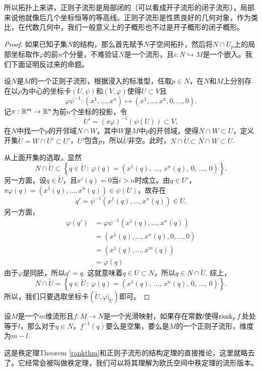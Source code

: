 所以拓扑上来讲，正则子流形是局部闭的（可以看成开子流形的闭子流形），局部来说他就像后几个坐标恒等的等高线。正则子流形是性质良好的几何对象，作为类比，在代数几何中，我们一般意义上的子概形也不过是开子概形的闭子概形。

\begin{proof}
如果已知子集$N$的结构，那么首先赋予$N$子空间拓扑，然后将$N\cap U_p$上的局部坐标取作$\varphi$的前$n$个分量，不难验证$N$是一个流形，且$i:N\hookrightarrow M$是一个嵌入。我们下面证明反过来的命题。

设$N$是$M$的一个正则子流形，根据浸入的标准型，任取$p\in N$，在$N$和$M$上分别存在以$p$为中心的坐标卡$(U,\psi)$和$(V,\varphi)$使得$U\subset V$且
\[
	\varphi\psi^{-1}:(x^1,\dots,x^n)\mapsto (x^1,\dots,x^n,0,\dots,0).
\]
记$\pi:\mathbb{R}^m\to \mathbb{R}^n$为前$n$个坐标的投影，令
\[
	U'=(\pi\varphi)^{-1}(\psi(U))\subset V,
\]
在$N$中找一个$p$的开邻域$N\cap W$，其中$W$是$M$中$p$的开邻域，使得$N\cap W\subset U$，定义开集$\tilde{U}=W\cap U'\subset U'$，$U'$包含$p$，所以$\tilde{U}$非空。此时，$N\cap \tilde{U}\subset N\cap W\subset U$.

从上面开集的选取，显然
\[
	N\cap \tilde{U}\subset \left\{q\in \tilde{U}\,:\,\varphi(q)=\left(x^1(q)\text{, $\dots$, }x^n(q)\text{, }0\text{, $\dots$, }0\right)\right\}.
\]
另一方面，设$q\in \tilde{U}$，且$x^i(q)=0$当$i> n$时成立。由$q\in U'$，$\pi\varphi(q)=(x^1(q),\dots,x^n(q))\in \psi(U)$，故存在
\[
	q'=\psi^{-1}(x^1(q),\dots,x^n(q))\in U.
\]
另一方面，
\begin{align*}
\varphi(q')&=\varphi\psi^{-1}(x^1(q),\dots,x^n(q))\\
&=(x^1(q),\dots,x^n(q),0,\dots,0)\\
&=(x^1(q),\dots,x^m(q))\\
&=\varphi(q)
\end{align*}
由于$\varphi$是同胚，所以$q'=q$. 这就意味着$q\in U\subset N$，所以$q\in N\cap \tilde{U}$. 综上，
\[
	N\cap \tilde{U}= \left\{q\in \tilde{U}\,:\,\varphi(q)=\left(x^1(q)\text{, $\dots$, }x^n(q)\text{, }0\text{, $\dots$, }0\right)\right\}.
\]
所以，我们只要选取坐标卡$(\tilde{U},\varphi|_{\tilde{U}})$即可。
\end{proof}

\begin{pro}
\label{ranktheo}设$M$是一个$m$维流形且$f:M\to N$是一个光滑映射，如果存在常数$l$使得$\operatorname{rank}_p f$处处等于$l$，那么对于$q\in N$，$f^{-1}(q)$要么是空集，要么是$M$的一个正则子流形，维度为$m-l$.
\end{pro} 

这是秩定理Theorem \ref{rankthm}和正则子流形的结构定理的直接推论，这里就略去了。它经常会被叫做秩定理，我们可以将其理解为欧氏空间中秩定理的流形版本。

